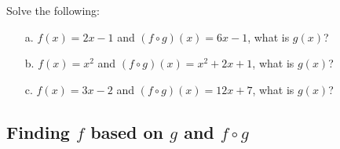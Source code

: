 \documentclass[a4paper,12pt]{book}
\newcounter{question}
\begin{document}
    
    \begin{questionNOGRADE}{\thequestion}

        Solve the following:
        
        \begin{itemize}
            \item[a.]   $f(x) = 2x-1$ and $(f \circ g)(x) = 6x-1$, what is $g(x)$?

            \item[b.]   $f(x) = x^{2}$ and $(f \circ g)(x) = x^{2} + 2x + 1$, what is $g(x)$?

            \item[c.]   $f(x) = 3x-2$ and $(f \circ g)(x) = 12x + 7$, what is $g(x)$?
            
        \end{itemize}
        
    \end{questionNOGRADE}

    \notonkey{ \newpage }{ \hrulefill }

    \subsection{Finding $f$ based on $g$ and $f \circ g$}
\end{document}
